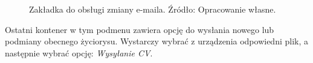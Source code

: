 \documentclass[twoside]{projektInzynierskiMS}
\numberwithin{figure}{section}
\begin{document}
\begin{figure}[h!]
\caption{Zakładka do obsługi zmiany e-maila. Źródło: Opracowanie własne.}
\label{fig:mobile_email_change}
\end{figure}
\newpage
Ostatni kontener w tym podmenu zawiera opcję do wysłania nowego lub podmiany obecnego życiorysu. Wystarczy wybrać z urządzenia odpowiedni plik, a następnie wybrać opcję: \textit{Wysyłanie CV}. 
\end{document}
